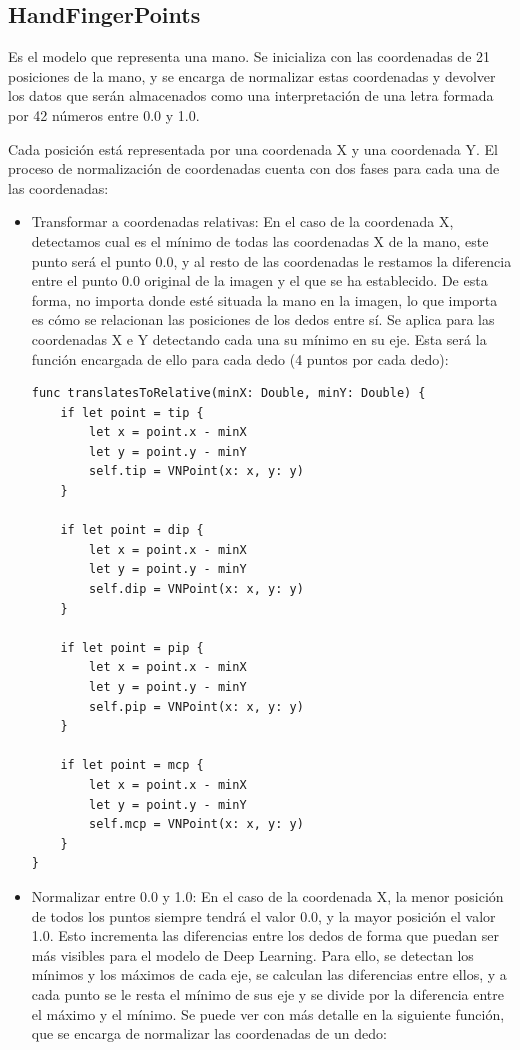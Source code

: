 \documentclass[../main.tex]{subfiles}
\begin{document}
\subsection{HandFingerPoints}

Es el modelo que representa una mano. Se inicializa con las coordenadas de 21 posiciones de la mano, y se encarga de normalizar estas coordenadas y devolver los datos que serán almacenados como una interpretación de una letra formada por 42 números entre 0.0 y 1.0.

Cada posición está representada por una coordenada X y una coordenada Y. El proceso de normalización de coordenadas cuenta con dos fases para cada una de las coordenadas:

\begin{itemize}
    \item Transformar a coordenadas relativas: En el caso de la coordenada X, detectamos cual es el mínimo de todas las coordenadas X de la mano, este punto será el punto 0.0, y al resto de las coordenadas le restamos la diferencia entre el punto 0.0 original de la imagen y el que se ha establecido. De esta forma, no importa donde esté situada la mano en la imagen, lo que importa es cómo se relacionan las posiciones de los dedos entre sí. Se aplica para las coordenadas X e Y detectando cada una su mínimo en su eje. Esta será la función encargada de ello para cada dedo (4 puntos por cada dedo):
    
\begin{lstlisting}[style=swift]
func translatesToRelative(minX: Double, minY: Double) {
    if let point = tip {
        let x = point.x - minX
        let y = point.y - minY
        self.tip = VNPoint(x: x, y: y)
    }
    
    if let point = dip {
        let x = point.x - minX
        let y = point.y - minY
        self.dip = VNPoint(x: x, y: y)
    }
    
    if let point = pip {
        let x = point.x - minX
        let y = point.y - minY
        self.pip = VNPoint(x: x, y: y)
    }
    
    if let point = mcp {
        let x = point.x - minX
        let y = point.y - minY
        self.mcp = VNPoint(x: x, y: y)
    }
}
\end{lstlisting}
    \item Normalizar entre 0.0 y 1.0: En el caso de la coordenada X, la menor posición de todos los puntos siempre tendrá el valor 0.0, y la mayor posición el valor 1.0. Esto incrementa las diferencias entre los dedos de forma que puedan ser más visibles para el modelo de Deep Learning. Para ello, se detectan los mínimos y los máximos de cada eje, se calculan las diferencias entre ellos, y a cada punto se le resta el mínimo de sus eje y se divide por la diferencia entre el máximo y el mínimo. Se puede ver con más detalle en la siguiente función, que se encarga de normalizar las coordenadas de un dedo:


\end{itemize}
\end{document}
